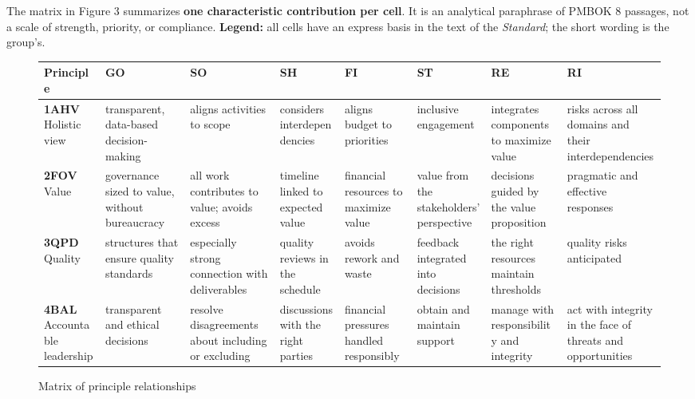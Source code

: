 \documentclass[12pt,a4paper,article,oneside,brazil,english]{abntex2}
\begin{document}
The matrix in Figure 3 summarizes \textbf{one characteristic contribution per cell}. It is an analytical paraphrase of PMBOK 8 passages, not a scale of strength, priority, or compliance. \textbf{Legend:} all cells have an express basis in the text of the \textit{Standard}; the short wording is the group's.

\begin{figure}[!htbp]
\centering
\caption{Matrix of principle relationships}\label{fig:3}
\begingroup\SingleSpacing\scriptsize
\begin{tabular}{@{}>{\raggedright\arraybackslash}p{}>{\raggedright\arraybackslash}p{}>{\raggedright\arraybackslash}p{}>{\raggedright\arraybackslash}p{}>{\raggedright\arraybackslash}p{}>{\raggedright\arraybackslash}p{}>{\raggedright\arraybackslash}p{}>{\raggedright\arraybackslash}p{}@{}}
\hline
\textbf{Principle} & \textbf{GO} & \textbf{SO} & \textbf{SH} & \textbf{FI} & \textbf{ST} & \textbf{RE} & \textbf{RI}\\
\hline
\rowcolor{bandaProativa}\textbf{1AHV} Holistic view & transparent, data-based decision-making & aligns activities to scope & considers interdependencies & aligns budget to priorities & inclusive engagement & integrates components to maximize value & risks across all domains and their interdependencies\\
\rowcolor{bandaValor}\textbf{2FOV} Value & governance sized to value, without bureaucracy & all work contributes to value; avoids excess & timeline linked to expected value & financial resources to maximize value & value from the stakeholders' perspective & decisions guided by the value proposition & pragmatic and effective responses\\
\rowcolor{bandaProativa}\textbf{3QPD} Quality & structures that ensure quality standards & especially strong connection with deliverables & quality reviews in the schedule & avoids rework and waste & feedback integrated into decisions & the right resources maintain thresholds & quality risks anticipated\\
\rowcolor{bandaResp}\textbf{4BAL} Accountable leadership & transparent and ethical decisions & resolve disagreements about including or excluding & discussions with the right parties & financial pressures handled responsibly & obtain and maintain support & manage with responsibility and integrity & act with integrity in the face of threats and opportunities\\

\end{tabular}
\end{figure}
\end{document}
